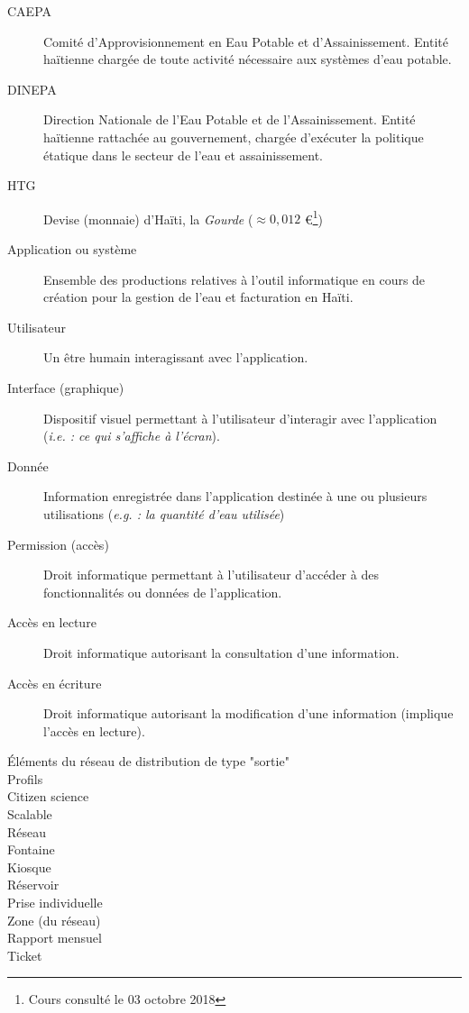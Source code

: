 \documentclass[a4paper, 11pt]{article}
\begin{document}
  \begin{description} %
    \item[CAEPA] Comité d'Approvisionnement en Eau Potable et d'Assainissement. Entité haïtienne chargée de toute activité nécessaire aux systèmes d'eau potable.
    \item[DINEPA] Direction Nationale de l'Eau Potable et de l'Assainissement. Entité haïtienne rattachée au gouvernement, chargée d'exécuter la politique étatique dans le secteur de l'eau et assainissement.
    \item[HTG] Devise (monnaie) d'Haïti, la \emph{Gourde} ($\approx 0,012$ \euro \footnote{Cours consulté le 03 octobre 2018})
    \item[Application ou système] Ensemble des productions relatives à l'outil informatique en cours de création pour la gestion de l'eau et facturation en Haïti.
    \item[Utilisateur] Un être humain interagissant avec l'application.
    \item[Interface (graphique)] Dispositif visuel permettant à l'utilisateur d'interagir avec l'application (\emph{i.e. : ce qui s'affiche à l'écran}).
    \item[Donnée] Information enregistrée dans l'application destinée à une ou plusieurs utilisations (\emph{e.g. : la quantité d'eau utilisée})
    \item[Permission (accès)] Droit informatique permettant à l'utilisateur d'accéder à des fonctionnalités ou données de l'application.
    \item[Accès en lecture] Droit informatique autorisant la consultation d'une information.
    \item[Accès en écriture] Droit informatique autorisant la modification d'une information (implique l'accès en lecture).
    \item[Éléments du réseau de distribution de type "sortie"] %
    \item[Profils]
    \item[Citizen science]
    \item[Scalable]
    \item[Réseau]
    \item[Fontaine]
    \item[Kiosque]
    \item[Réservoir]
    \item[Prise individuelle]
    \item[Zone (du réseau)]
    \item[Rapport mensuel]
    \item[Ticket]
  \end{description}
\end{document}
